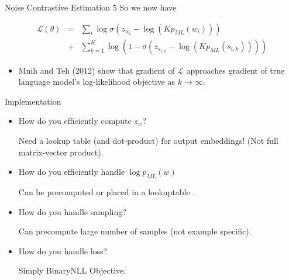 \documentclass{beamer}
\begin{document}
\begin{frame}{Noise Contrastive Estimation 5}
%
%
So we now have
  
  \begin{eqnarray*}
\mathcal{L}(\theta)
   &=& \sum_{i} \log \sigma(z_{w_i} - \log(K p_{ML}(w_i))) \\
 &+&   \sum_{k=1}^{K} \log (1- \sigma(z_{s_{i,k}} - \log(K p_{ML}(s_{i,k}))))  
 \end{eqnarray*}
 
 \begin{itemize}
 \item Mnih and Teh (2012) show that gradient of $\mathcal{L}$ approaches gradient of true language model's log-likelihood objective as $k \rightarrow \infty$.
 \end{itemize}
\end{frame}

\begin{frame}{Implementation}
  \begin{itemize}
  \item How do you efficiently compute $z_w$?

    Need a lookup table (and dot-product) for output embeddings! (Not full matrix-vector product).

  \item How do you efficiently handle $\log p_{ML}(w)$
  
    Can be precomputed or placed in a lookuptable .

  \item How do you handle sampling?

    Can precompute large number of samples (not example specific).

    \item How do you handle loss?

    Simply BinaryNLL Objective.
  \end{itemize}
\end{frame}
\end{document}
